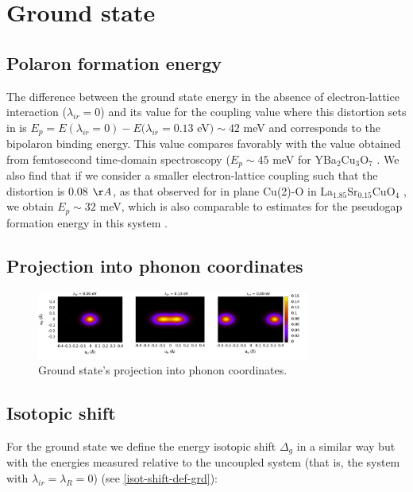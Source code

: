 \chapter{Ground state}

\section{Polaron formation energy}


The difference between the ground state energy in the absence of electron-lattice interaction ($\lambda_{ir}=0$) and its value for the coupling value where this distortion sets in is $E_p = E(\lambda_{ir}=0)- E(\lambda_{ir}=0.13$ eV$) \sim 42$ meV and corresponds to the bipolaron binding energy. This value compares favorably with the value obtained from femtosecond time-domain spectroscopy ($E_p \sim 45$ meV for YBa$_2$Cu$_3$O$_7$ \cite{Demsar1999}. We also find that if we consider a smaller electron-lattice coupling such that the distortion is 0.08 $\AA$, as that observed for in plane Cu(2)-O in La$_{1.85}$Sr$_{0.15}$CuO$_4$ \cite{Bianconi1996}, we obtain $E_p \sim 32$ meV, which is also comparable to estimates for the pseudogap formation energy in this system \cite{Kusar2005}.

\section{Projection into phonon coordinates}

\begin{figure}[ht!]
\centering
\includegraphics[width=0.8\textwidth]{images/ph-ground.png}
\caption{Ground state's projection into phonon coordinates.}
\label{fig:ph-ground}
\end{figure}

\section{Isotopic shift}

For the ground state we define the energy isotopic shift $\Delta_g$ in a similar way but with the energies measured relative to the uncoupled system (that is, the system with $\lambda_{ir}=\lambda_R=0$) (see \ref{isot-shift-def-grd}):


